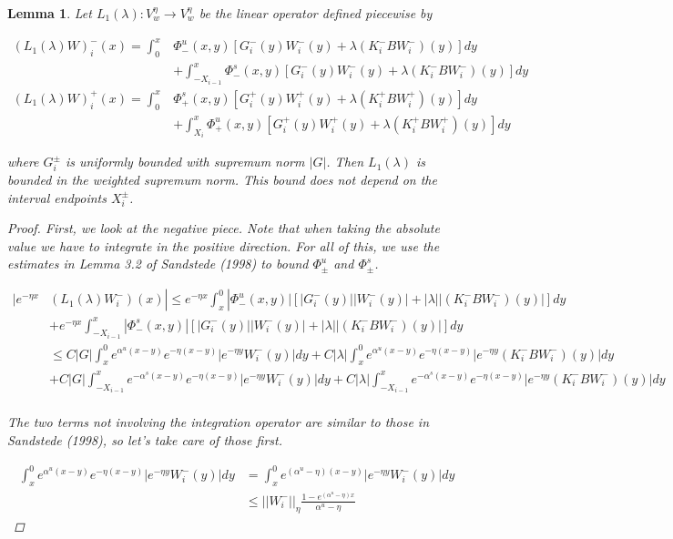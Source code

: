 \documentclass[12pt]{article}
\newtheorem{lemma}{Lemma}
\begin{document}
\begin{lemma}

Let $L_1(\lambda): V_w^\eta \rightarrow V_w^\eta$ be the linear operator defined piecewise by

\begin{align*}
(L_1(\lambda)W)_i^-(x) = \int_0^x &\Phi^u_-(x, y)[G_i^-(y) W_i^-(y) + \lambda (K_i^- B W_i^-)(y) ] dy \\
&+ \int_{-X_{i-1}}^x \Phi^s_-(x, y)[G_i^-(y) W_i^-(y) + \lambda (K_i^-B W_i^-)(y) ] dy \\
(L_1(\lambda)W)_i^+(x) = \int_0^x &\Phi^s_+(x, y)[G_i^+(y) W_i^+(y) + \lambda (K_i^+ B W_i^+)(y)] dy \\
&+ \int_{X_{i}}^x \Phi^u_+(x, y)[G_i^+(y) W_i^+(y) + \lambda (K_i^+ B W_i^+)(y) ] dy
\end{align*}

where $G_i^\pm$ is uniformly bounded with supremum norm $|G|$. Then $L_1(\lambda)$ is bounded in the weighted supremum norm. This bound does not depend on the interval endpoints $X_i^\pm$.

\begin{proof}
First, we look at the negative piece. Note that when taking the absolute value we have to integrate in the positive direction. For all of this, we use the estimates in Lemma 3.2 of Sandstede (1998) to bound $\Phi^u_\pm$ and $\Phi^s_\pm$.

\begin{align*}
|e^{-\eta x} & (L_1(\lambda)W_i^-)(x) | \leq  e^{-\eta x} \int_x^0 |\Phi^u_-(x, y)|[|G_i^-(y)||W_i^-(y)| + |\lambda||(K_i^- B W_i^-)(y)| ] dy \\
&+ e^{-\eta x} \int_{-X_{i-1}}^x |\Phi^s_-(x, y)|[|G_i^-(y)||W_i^-(y)| + |\lambda||(K_i^- B W_i^-)(y)| ] dy \\
&\leq C|G| \int_x^0 e^{\alpha^u (x-y)}e^{-\eta(x-y)}|e^{-\eta y} W_i^-(y)| dy 
+ C|\lambda|\int_x^0 e^{\alpha^u (x-y)}e^{-\eta(x-y)}|e^{-\eta y} (K_i^- B W_i^-)(y)| dy \\
&+ C|G| \int_{-X_{i-1}}^x e^{-\alpha^s (x-y)}e^{-\eta(x-y)}|e^{-\eta y} W_i^-(y)| dy 
+ C|\lambda|\int_{-X_{i-1}}^x e^{-\alpha^s (x-y)}e^{-\eta(x-y)}|e^{-\eta y} (K_i^- B W_i^-)(y)| dy  \\ 
\end{align*}

The two terms not involving the integration operator are similar to those in Sandstede (1998), so let's take care of those first.

\begin{align*}
\int_x^0 e^{\alpha^u (x-y)}e^{-\eta(x-y)}|e^{-\eta y} W_i^-(y)| dy &= \int_x^0 e^{(\alpha^u - \eta) (x-y)}|e^{-\eta y} W_i^-(y)| dy \\
&\leq ||W_i^-||_\eta \frac{1 - e^{(\alpha^u - \eta)x}}{\alpha^u - \eta}
\end{align*}


\end{proof}
\end{lemma}
\end{document}

